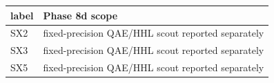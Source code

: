 \begin{tabular}{ll}
\hline
label & Phase 8d scope \\
\hline
SX2 & fixed-precision QAE/HHL scout reported separately \\
SX3 & fixed-precision QAE/HHL scout reported separately \\
SX5 & fixed-precision QAE/HHL scout reported separately \\
\hline
\end{tabular}
